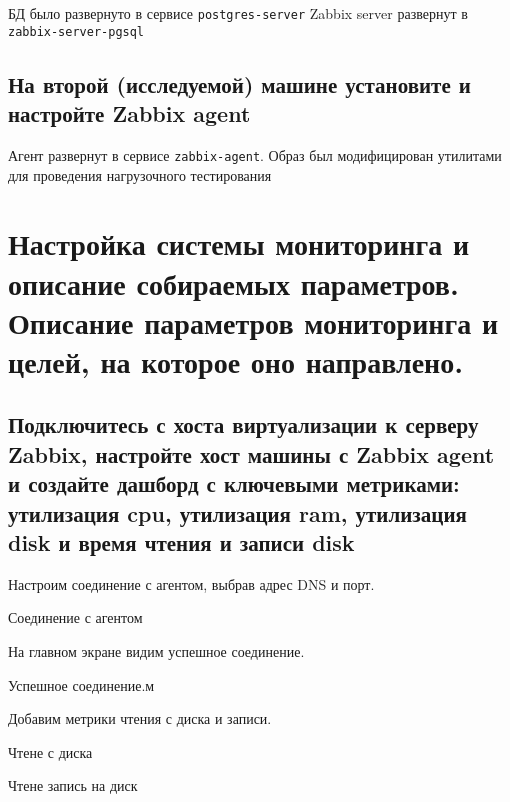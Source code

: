 БД было развернуто в сервисе \texttt{postgres-server} Zabbix server развернут в \texttt{zabbix-server-pgsql}

\subsection{На второй (исследуемой) машине установите и настройте Zabbix agent}

Агент развернут в сервисе \texttt{zabbix-agent}.
Образ был модифицирован утилитами для проведения нагрузочного тестирования



\section{Настройка системы мониторинга и описание собираемых параметров.
Описание параметров мониторинга и целей, на которое оно направлено.}

\subsection{Подключитесь с хоста виртуализации к серверу Zabbix, настройте хост
машины с Zabbix agent и создайте дашборд с ключевыми метриками:
утилизация cpu, утилизация ram, утилизация disk и время чтения и записи disk}

Настроим соединение с агентом, выбрав адрес DNS и порт.
\begin{image}
    \caption{Соединение с агентом}
    \label{fig:host-conf}
\end{image}

На главном экране видим успешное соединение.

\begin{image}
    \caption{Успешное соединение.м}
    \label{fig:main-dash-board}
\end{image}


Добавим метрики чтения с диска и записи.

\begin{image}
    \caption{Чтене с диска}
    \label{fig:read-conf}
\end{image}

\begin{image}
    \caption{Чтене запись на диск}
    \label{fig:write-conf}
\end{image}

